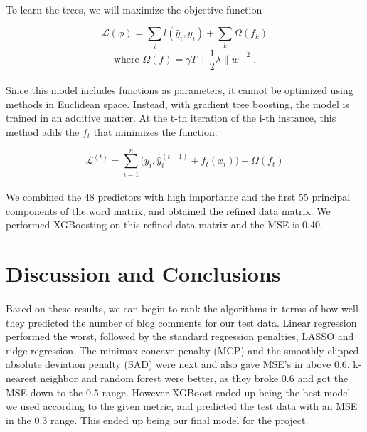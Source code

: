 \documentclass[paper=a4, fontsize=11pt]{scrartcl} %
\numberwithin{equation}{section} %
\numberwithin{figure}{section} %
\numberwithin{table}{section} %
\begin{document}
{\paragraph{}
To learn the trees, we will maximize the objective function

$$\mathcal{L}(\phi) = \sum_i l(\hat{y}_i, y_i) + \sum_k \Omega( f_k )$$
$$\text{where } \Omega( f ) = \gamma T + \frac{1}{2} \lambda \| w \|^2.$$

\paragraph{}
Since this model includes functions as parameters, it cannot be optimized using methods in Euclidean space. Instead, with gradient tree boosting, the model is trained in an additive matter. At the t-th iteration of the i-th instance, this method adds the $f_t$ that minimizes the function:

$$\mathcal{L}^{(t)} = \sum_{i=1}^n \big(y_i, \hat{y}_i ^{(t-1)} + f_t (x_i)\big) + \Omega(f_t) $$

\paragraph{}
We combined the 48 predictors with high importance and the first 55 principal components of the word matrix, and obtained the refined data matrix. We performed XGBoosting on this refined data matrix and the MSE is 0.40.


%
%

\section{Discussion and Conclusions}

\paragraph{}
Based on these results, we can begin to rank the algorithms in terms of how well they predicted the number of blog comments for our test data. Linear regression performed the worst, followed by the standard regression penalties, LASSO and ridge regression. The minimax concave penalty (MCP) and the smoothly clipped absolute deviation penalty (SAD) were next and also gave MSE's in above 0.6. k-nearest neighbor and random forest were better, as they broke 0.6 and got the MSE down to the 0.5 range. However XGBoost ended up being the best model we used according to the given metric, and predicted the test data with an MSE in the 0.3 range. This ended up being our final model for the project.

}
\end{document}
